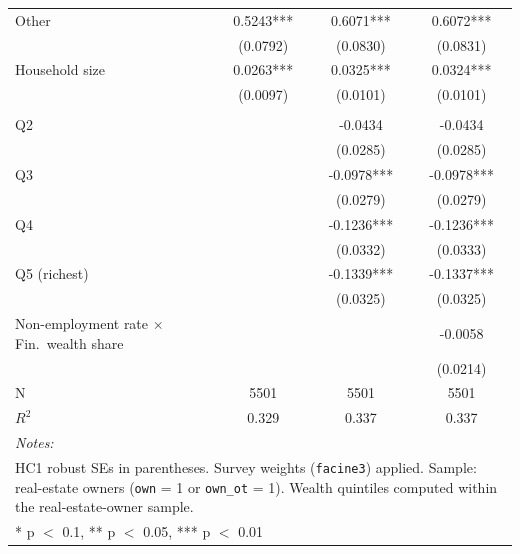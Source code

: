 \begin{table}[!h]
\begin{tabular}[t]{lccc}
\hspace{6pt} Other & 0.5243*** & 0.6071*** & 0.6072***\\
 & (0.0792) & (0.0830) & (0.0831)\\
Household size & 0.0263*** & 0.0325*** & 0.0324***\\
 & (0.0097) & (0.0101) & (0.0101)\\
\addlinespace[0.3em]
\multicolumn{4}{l}{\textit{Wealth quintile (ref.: Q1)}}\\
\hspace{6pt} Q2 &  & -0.0434 & -0.0434\\
 &  & (0.0285) & (0.0285)\\
\hspace{6pt} Q3 &  & -0.0978*** & -0.0978***\\
 &  & (0.0279) & (0.0279)\\
\hspace{6pt} Q4 &  & -0.1236*** & -0.1236***\\
 &  & (0.0332) & (0.0333)\\
\hspace{6pt} Q5 (richest) &  & -0.1339*** & -0.1337***\\
 &  & (0.0325) & (0.0325)\\
Non-employment rate $\times$ Fin.\ wealth share &  &  & -0.0058\\
 &  &  & (0.0214)\\
\midrule
N & 5501 & 5501 & 5501\\
$R^2$ & 0.329 & 0.337 & 0.337\\
\bottomrule
\multicolumn{4}{l}{\rule{0pt}{1em}\textit{Notes: }}\\
\multicolumn{4}{l}{\rule{0pt}{1em}HC1 robust SEs in parentheses. Survey weights (\texttt{facine3}) applied. Sample: real-estate owners (\texttt{own} = 1 or \texttt{own\_ot} = 1). Wealth quintiles computed within the real-estate-owner sample.}\\
\multicolumn{4}{l}{\rule{0pt}{1em}* p $<$ 0.1, ** p $<$ 0.05, *** p $<$ 0.01}\\
\end{tabular}
\end{table}
